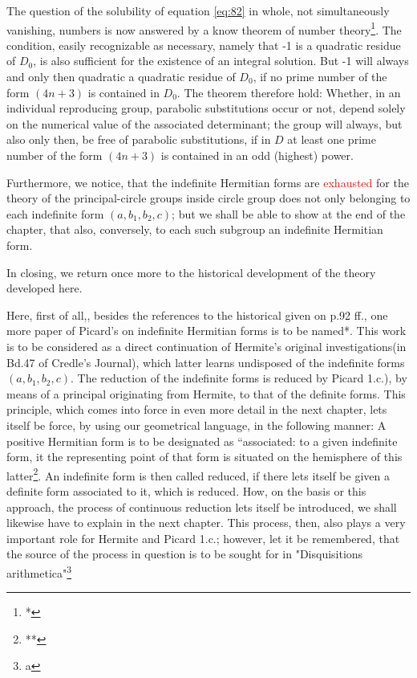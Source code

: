 The question of the solubility of equation \ref{eq:82} in whole, not simultaneously vanishing, numbers is now answered by a know theorem of number theory\footnote{*}. The condition, easily recognizable as necessary, namely that -1 is a quadratic residue of $D_0$, is also sufficient for the existence of an integral solution. But -1 will always and only then quadratic a quadratic residue of $D_0$, if no prime number of the form $(4n+3)$ is contained in $D_0$. The theorem therefore hold: Whether, in an individual reproducing group, parabolic substitutions occur or not, depend solely on the numerical value of the associated determinant; the group will always, but also only then, be free of parabolic substitutions, if in $D$ at least one prime number of the form $(4n+3)$ is contained in an odd (highest) power.

Furthermore, we notice, that the indefinite Hermitian forms are \textcolor{red}{exhausted} for the theory of the principal-circle groups inside circle group does not only belonging to each indefinite form $(a,b_1,b_2,c)$; but we shall be able to show at the end of the chapter, that also, conversely, to each such subgroup an indefinite Hermitian form.

In closing, we return once more to the historical development of the theory developed here.

Here, first of all,, besides the references to the historical given on p.92 ff., one more paper of Picard’s on indefinite Hermitian forms is to be named*. This work is to be considered  as a direct continuation of Hermite’s original investigations(in Bd.47 of Credle's Journal), which latter learns undisposed of the indefinite forms $(a,b_1,b_2,c)$. The reduction of the indefinite forms is reduced by Picard 1.c.), by means of a principal originating from Hermite, to that of the definite forms. This principle, which comes into force in even more detail in the next chapter, lets itself be force, by using our geometrical language, in the following manner: A positive Hermitian form is to be designated as “associated: to a given indefinite form, it the representing point of that form is situated on the hemisphere of this latter\footnote{ **}. An indefinite form is then called reduced, if there lets itself be given a definite form associated to it, which is reduced. How, on the basis or this approach, the process of continuous reduction lets itself be introduced, we shall likewise have to explain in the next chapter. This process, then, also plays a very important role for Hermite and Picard 1.c.; however, let it be remembered, that the source of the process in question is to be sought for in "Disquisitions arithmetica"\footnote{a}

